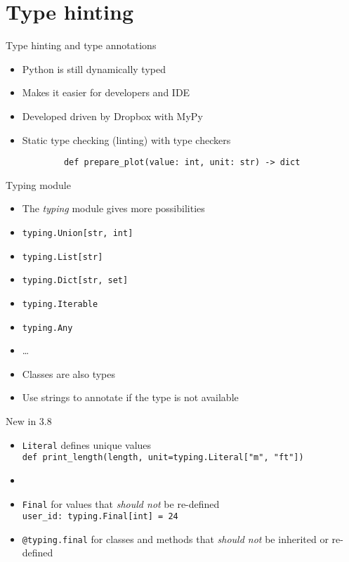 \section{Type hinting}

\begin{frame}[fragile]{Type hinting and type annotations}
  \begin{itemize}
    \item Python is still dynamically typed
    \item Makes it easier for developers and IDE
    \item Developed driven by Dropbox with MyPy
    \item Static type checking (linting) with type checkers
  \end{itemize}

  \begin{figure}
    \begin{verbatim}
      def prepare_plot(value: int, unit: str) -> dict
    \end{verbatim}
  \end{figure}

\end{frame}

\begin{frame}{Typing module}
  \begin{itemize}
    \item The \emph{typing} module gives more possibilities
    \item \texttt{typing.Union[str, int]}
    \item \texttt{typing.List[str]}
    \item \texttt{typing.Dict[str, set]}
    \item \texttt{typing.Iterable}
    \item \texttt{typing.Any}
    \item …
    \item Classes are also types
    \item Use strings to annotate if the type is not available
  \end{itemize}
\end{frame}

\begin{frame}[fragile]{New in 3.8}
  \begin{itemize}
    \item \texttt{Literal} defines unique values\\
      {\small\texttt{def print_length(length, unit=typing.Literal["m", "ft"])}}
    \item[]
    \item \texttt{Final} for values that \emph{should not} be re-defined\\
     \texttt{user_id: typing.Final[int] = 24}
    \item \texttt{@typing.final} for classes and methods that \emph{should not} be inherited or re-defined
  \end{itemize}
\end{frame}

